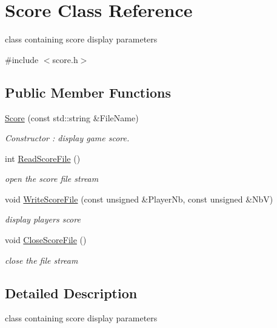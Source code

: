 \hypertarget{class_score}{}\section{Score Class Reference}
\label{class_score}


class containing score display parameters  




{\ttfamily \#include $<$score.\+h$>$}

\subsection*{Public Member Functions}
\begin{DoxyCompactItemize}
\item 
\hyperlink{class_score_a3b3407ca64d44deddef0c688db7c08da}{Score} (const std\+::string \&File\+Name)
\begin{DoxyCompactList}\small\item\em Constructor \+: display game score. \end{DoxyCompactList}\item 
int \hyperlink{class_score_ad8c669f62f20e3db4e814366ce41682a}{Read\+Score\+File} ()
\begin{DoxyCompactList}\small\item\em open the score file stream \end{DoxyCompactList}\item 
void \hyperlink{class_score_a9999a47bbd571bc5393b77325ad97e91}{Write\+Score\+File} (const unsigned \&Player\+Nb, const unsigned \&NbV)
\begin{DoxyCompactList}\small\item\em display player\textquotesingle{}s score \end{DoxyCompactList}\item 
\mbox{\label{class_score_adc87c97ea94740f829a6ea9491394032}} 
void \hyperlink{class_score_adc87c97ea94740f829a6ea9491394032}{Close\+Score\+File} ()
\begin{DoxyCompactList}\small\item\em close the file stream \end{DoxyCompactList}\end{DoxyCompactItemize}


\subsection{Detailed Description}
class containing score display parameters 

